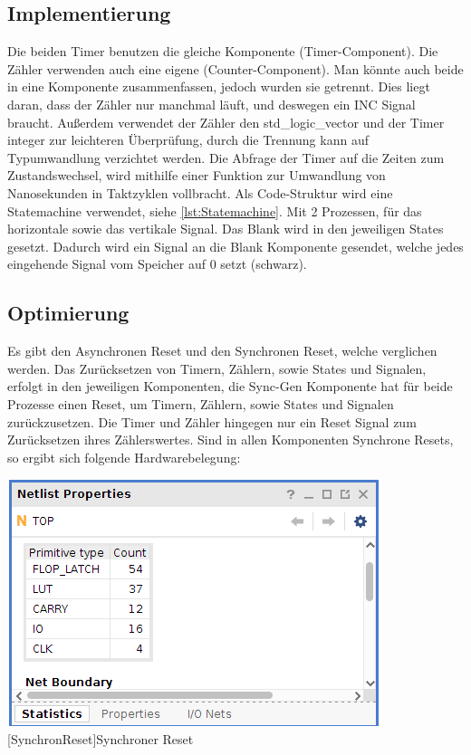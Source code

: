 \documentclass[12pt,a4paper,bibliography=totoc,listof=totoc]{scrartcl}
\begin{document}
\subsection{Implementierung}
Die beiden Timer benutzen die gleiche Komponente (Timer-Component). Die Zähler verwenden auch eine eigene (Counter-Component). Man könnte auch beide in eine Komponente 
zusammenfassen, jedoch wurden sie getrennt. Dies liegt daran, dass der Zähler nur manchmal läuft, und deswegen ein INC Signal braucht. Außerdem verwendet der Zähler den 
std\_logic\_vector und der Timer integer zur leichteren Überprüfung, durch die Trennung kann auf Typumwandlung verzichtet werden.
Die Abfrage der Timer auf die Zeiten zum Zustandswechsel, wird mithilfe einer Funktion zur Umwandlung von Nanosekunden in Taktzyklen vollbracht.
Als Code-Struktur wird eine Statemachine verwendet, siehe \ref{lst:Statemachine}. Mit 2 Prozessen, für das horizontale sowie das vertikale Signal. Das Blank wird in den
jeweiligen States gesetzt. Dadurch wird ein Signal an die Blank Komponente gesendet, welche jedes eingehende Signal vom Speicher auf 0 setzt (schwarz).

\subsection{Optimierung}
Es gibt den Asynchronen Reset und den Synchronen Reset, welche verglichen werden.
Das Zurücksetzen von Timern, Zählern, sowie States und Signalen, erfolgt in den jeweiligen Komponenten, die Sync-Gen Komponente hat für beide Prozesse einen Reset, um
Timern, Zählern, sowie States und Signalen zurückzusetzen. Die Timer und Zähler hingegen nur ein Reset Signal zum Zurücksetzen ihres Zählerswertes. Sind in allen 
Komponenten Synchrone Resets, so ergibt sich folgende Hardwarebelegung:

\vspace{1em}
\begin{minipage}{\linewidth}
	\centering
	\includegraphics[width=0.5\linewidth]{pics/SynchronousNetListProperties.png}
	[SynchronReset]{Synchroner Reset}
	\label{fig:Synchroner Reset}
\end{minipage}
\end{document}
